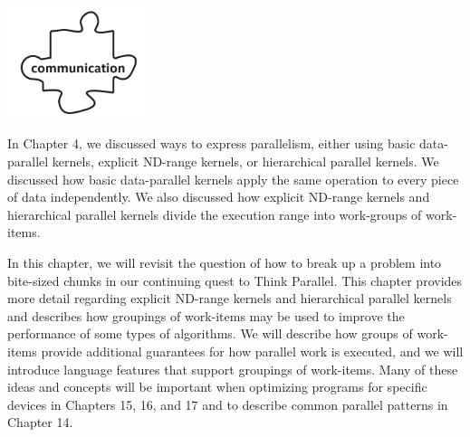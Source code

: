 \begin{center}
	\includegraphics[width=0.3\textwidth]{content/chapter-9/images/1}
\end{center}

In Chapter 4, we discussed ways to express parallelism, either using basic data-parallel kernels, explicit ND-range kernels, or hierarchical parallel kernels. We discussed how basic data-parallel kernels apply the same operation to every piece of data independently. We also discussed how explicit ND-range kernels and hierarchical parallel kernels divide the execution range into work-groups of work-items.\par

In this chapter, we will revisit the question of how to break up a problem into bite-sized chunks in our continuing quest to Think Parallel. This chapter provides more detail regarding explicit ND-range kernels and hierarchical parallel kernels and describes how groupings of work-items may be used to improve the performance of some types of algorithms. We will describe how groups of work-items provide additional guarantees for how parallel work is executed, and we will introduce language features that support groupings of work-items. Many of these ideas and concepts will be important when optimizing programs for specific devices in Chapters 15, 16, and 17 and to describe common parallel patterns in Chapter 14.\par